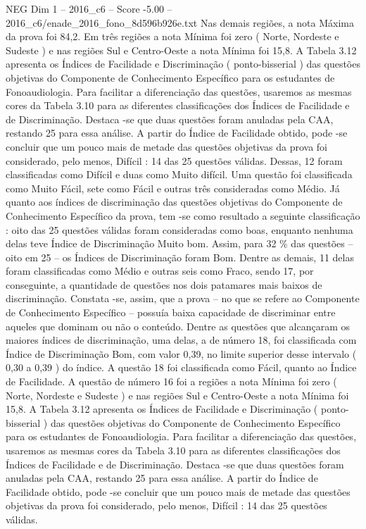 \begin{textsample}{NEG Dim 1 – 2016\_c6 – Score -5.00 – 2016\_c6/enade\_2016\_fono\_8d596b926e.txt}
Nas demais regiões, a nota Máxima da prova foi 84,2.
Em três regiões a nota Mínima foi zero ( Norte, Nordeste e Sudeste ) e nas regiões Sul e Centro-Oeste a nota Mínima foi 15,8.
A Tabela 3.12 apresenta os Índices de Facilidade e Discriminação ( ponto-bisserial ) das questões objetivas do Componente de Conhecimento Específico para os estudantes de Fonoaudiologia.
Para facilitar a diferenciação das questões, usaremos as mesmas cores da Tabela 3.10 para as diferentes classificações dos Índices de Facilidade e de Discriminação.
Destaca -se que duas questões foram anuladas pela CAA, restando 25 para essa análise.
A partir do Índice de Facilidade obtido, pode -se concluir que um pouco mais de metade das questões objetivas da prova foi considerado, pelo menos, Difícil : 14 das 25 questões válidas.
Dessas, 12 foram classificadas como Difícil e duas como Muito difícil.
Uma questão foi classificada como Muito Fácil, sete como Fácil e outras três consideradas como Médio.
Já quanto aos índices de discriminação das questões objetivas do Componente de Conhecimento Específico da prova, tem -se como resultado a seguinte classificação : oito das 25 questões válidas foram consideradas como boas, enquanto nenhuma delas teve Índice de Discriminação Muito bom.
Assim, para 32 \% das questões – oito em 25 – os Índices de Discriminação foram Bom.
Dentre as demais, 11 delas foram classificadas como Médio e outras seis como Fraco, sendo 17, por conseguinte, a quantidade de questões nos dois patamares mais baixos de discriminação.
Constata -se, assim, que a prova – no que se refere ao Componente de Conhecimento Específico – possuía baixa capacidade de discriminar entre aqueles que dominam ou não o conteúdo.
Dentre as questões que alcançaram os maiores índices de discriminação, uma delas, a de número 18, foi classificada com Índice de Discriminação Bom, com valor 0,39, no limite superior desse intervalo ( 0,30 a 0,39 ) do índice.
A questão 18 foi classificada como Fácil, quanto ao Índice de Facilidade.
A questão de número 16 foi a regiões a nota Mínima foi zero ( Norte, Nordeste e Sudeste ) e nas regiões Sul e Centro-Oeste a nota Mínima foi 15,8.
A Tabela 3.12 apresenta os Índices de Facilidade e Discriminação ( ponto-bisserial ) das questões objetivas do Componente de Conhecimento Específico para os estudantes de Fonoaudiologia.
Para facilitar a diferenciação das questões, usaremos as mesmas cores da Tabela 3.10 para as diferentes classificações dos Índices de Facilidade e de Discriminação.
Destaca -se que duas questões foram anuladas pela CAA, restando 25 para essa análise.
A partir do Índice de Facilidade obtido, pode -se concluir que um pouco mais de metade das questões objetivas da prova foi considerado, pelo menos, Difícil : 14 das 25 questões válidas.

\end{textsample}
